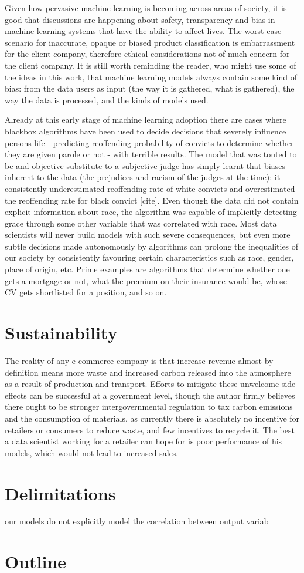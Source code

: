 Given how pervasive  machine learning is becoming across areas of society, it is good that discussions are happening about safety, transparency and bias in machine learning systems that have the ability to affect lives.
The worst case scenario for inaccurate,  opaque or biased product classification  is embarrassment for the client company,  therefore ethical considerations not of much concern for the client company.
It is still worth reminding the reader, who might use some of the ideas in this work,  that machine learning  models always contain some kind of bias:  from the data users as input (the way it is gathered, what is gathered),  the way the data is processed, and the kinds of models used.

Already at this early stage of machine learning adoption there are cases where blackbox algorithms have been used to decide decisions that severely influence persons life -  predicting reoffending probability  of convicts to determine  whether they are given parole or not - with terrible results.
The model that was touted to be and objective substitute to a subjective judge has simply learnt that biases inherent to the data (the prejudices and racism of  the judges at the time):  it consistently underestimated reoffending rate of white convicts and overestimated the reoffending rate for black convict [cite].
Even though the data did not contain explicit information about race, the algorithm  was capable of implicitly detecting grace through some other variable that was correlated with race.
Most data scientists will never build models with such severe consequences, but even more subtle decisions  made autonomously by algorithms  can prolong the  inequalities of our society by consistently favouring certain  characteristics such as race, gender, place of origin, etc.
Prime examples are algorithms that determine whether one gets a mortgage or not, what the premium on their insurance would be, whose CV gets shortlisted for a position, and so on.

\section{Sustainability}

The reality of any e-commerce company is that increase revenue almost by definition means more waste  and increased carbon released into the atmosphere  as a result of production and transport.
Efforts to mitigate these unwelcome side effects can be successful at a government level, though  the author firmly believes there ought to be stronger intergovernmental regulation to tax carbon emissions and the consumption of materials, as currently there is absolutely no incentive for retailers or consumers to reduce waste, and few incentives to recycle it.
The best a data scientist working for a retailer can hope for is poor performance of his models, which would not lead to increased sales.

\section{Delimitations}

our models do not explicitly model the correlation between output variab

\section{Outline}
